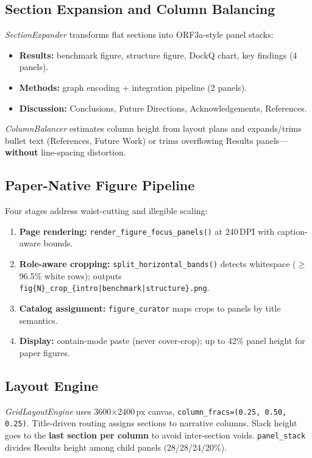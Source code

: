 \documentclass{article}
\begin{document}
\subsection{Section Expansion and Column Balancing}

\emph{SectionExpander} transforms flat sections into ORF3a-style panel stacks:
\begin{itemize}[leftmargin=*]
  \item \textbf{Results:} benchmark figure, structure figure, DockQ chart, key findings (4 panels).
  \item \textbf{Methods:} graph encoding + integration pipeline (2 panels).
  \item \textbf{Discussion:} Conclusions, Future Directions, Acknowledgements, References.
\end{itemize}

\emph{ColumnBalancer} estimates column height from layout plans and expands/trims bullet text (References, Future Work) or trims overflowing Results panels---\textbf{without} line-spacing distortion.

\subsection{Paper-Native Figure Pipeline}
\label{sec:figures}

Four stages address waist-cutting and illegible scaling:
\begin{enumerate}[label=\textbf{S\arabic*.}, leftmargin=*]
  \item \textbf{Page rendering:} \texttt{render\_figure\_focus\_panels()} at 240\,DPI with caption-aware bounds.
  \item \textbf{Role-aware cropping:} \texttt{split\_horizontal\_bands()} detects whitespace ($\geq$96.5\% white rows); outputs \texttt{fig\{N\}\_crop\_\{intro|benchmark|structure\}.png}.
  \item \textbf{Catalog assignment:} \texttt{figure\_curator} maps crops to panels by title semantics.
  \item \textbf{Display:} contain-mode paste (never cover-crop); up to 42\% panel height for paper figures.
\end{enumerate}

\subsection{Layout Engine}

\emph{GridLayoutEngine} uses 3600$\times$2400\,px canvas, \texttt{column\_fracs=(0.25, 0.50, 0.25)}. Title-driven routing assigns sections to narrative columns. Slack height goes to the \textbf{last section per column} to avoid inter-section voids. \texttt{panel\_stack} divides Results height among child panels (28/28/24/20\%).
\end{document}
